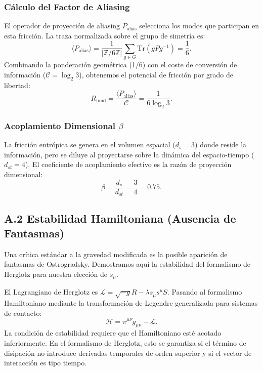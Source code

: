 \documentclass[12pt, a4paper]{article}
\theoremstyle{plain}
\theoremstyle{definition}
\begin{document}
\subsubsection{Cálculo del Factor de Aliasing}
El operador de proyección de aliasing $P_{\text{alias}}$ selecciona los modos que participan en esta fricción. La traza normalizada sobre el grupo de simetría es:
\begin{equation}
\langle P_{\text{alias}} \rangle = \frac{1}{|\mathbb{Z}/6\mathbb{Z}|} \sum_{g \in G} \text{Tr}(g P g^{-1}) = \frac{1}{6}.
\end{equation}
Combinando la ponderación geométrica (1/6) con el coste de conversión de información ($\mathcal{C} = \log_2 3$), obtenemos el potencial de fricción por grado de libertad:
\begin{equation}
R_{\text{fund}} = \frac{\langle P_{\text{alias}} \rangle}{\mathcal{C}} = \frac{1}{6 \log_2 3}.
\end{equation}

\subsubsection{Acoplamiento Dimensional \texorpdfstring{$\beta$}{beta}}
La fricción entrópica se genera en el volumen espacial ($d_s=3$) donde reside la información, pero se diluye al proyectarse sobre la dinámica del espacio-tiempo ($d_{st}=4$). El coeficiente de acoplamiento efectivo es la razón de proyección dimensional:
\begin{equation}
\beta = \frac{d_s}{d_{st}} = \frac{3}{4} = 0.75.
\end{equation}

\subsection{A.2 Estabilidad Hamiltoniana (Ausencia de Fantasmas)}
\label{app:stability}

Una crítica estándar a la gravedad modificada es la posible aparición de fantasmas de Ostrogradsky. Demostramos aquí la estabilidad del formalismo de Herglotz para nuestra elección de $s_\mu$.

El Lagrangiano de Herglotz es $\mathcal{L} = \sqrt{-g}R - \lambda s_\mu s^\mu S$. Pasando al formalismo Hamiltoniano mediante la transformación de Legendre generalizada para sistemas de contacto:
\begin{equation}
\mathcal{H} = \pi^{\mu\nu} \dot{g}_{\mu\nu} - \mathcal{L}.
\end{equation}
La condición de estabilidad requiere que el Hamiltoniano esté acotado inferiormente. En el formalismo de Herglotz, esto se garantiza si el término de disipación no introduce derivadas temporales de orden superior y si el vector de interacción es tipo tiempo.
\end{document}
